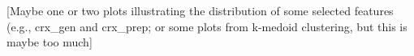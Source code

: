  




[Maybe one or two plots illustrating the distribution of some selected features (e.g., crx\_gen and crx\_prep; or some plots from k-medoid clustering, but this is maybe too much]
